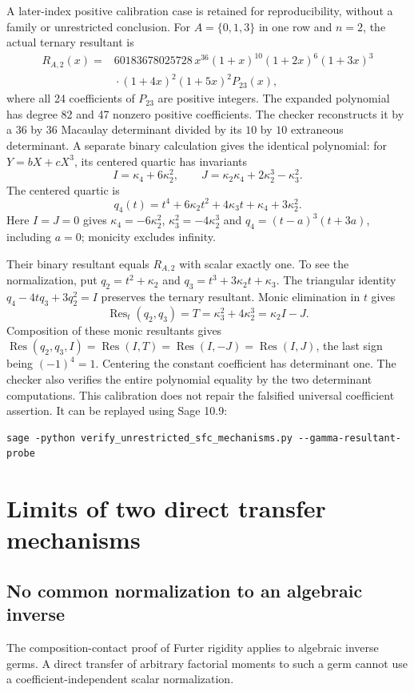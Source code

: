 \documentclass[11pt]{article}
\begin{document}
A later-index positive calibration case is retained for reproducibility,
without a family or unrestricted conclusion. For $A=\{0,1,3\}$ in one
row and $n=2$, the actual ternary resultant is
\[
 \begin{split}
 R_{A,2}(x)={}&60183678025728\,x^{36}
 (1+x)^{10}(1+2x)^6(1+3x)^3\\
 &{}\cdot(1+4x)^2(1+5x)^2 P_{23}(x),
 \end{split}
\]
where all 24 coefficients of $P_{23}$ are positive integers.
The expanded polynomial has degree 82 and 47 nonzero positive
coefficients. The checker reconstructs it by a $36$ by $36$ Macaulay
determinant divided by its $10$ by $10$ extraneous determinant.
A separate binary calculation gives the identical polynomial:
for $Y=bX+cX^3$, its centered quartic has invariants
\[
 I=\kappa_4+6\kappa_2^2,\qquad
 J=\kappa_2\kappa_4+2\kappa_2^3-\kappa_3^2.
\]
The centered quartic is
\[
 q_4(t)=t^4+6\kappa_2t^2+4\kappa_3t+\kappa_4+3\kappa_2^2.
\]
Here $I=J=0$ gives
$\kappa_4=-6\kappa_2^2$, $\kappa_3^2=-4\kappa_2^3$ and
$q_4=(t-a)^3(t+3a)$, including $a=0$; monicity excludes infinity.

Their binary resultant equals $R_{A,2}$ with scalar exactly one.
To see the normalization, put $q_2=t^2+\kappa_2$ and
$q_3=t^3+3\kappa_2t+\kappa_3$. The triangular identity
$q_4-4tq_3+3q_2^2=I$ preserves the ternary resultant.
Monic elimination in $t$ gives
\[
 \operatorname{Res}_t(q_2,q_3)
       =T=\kappa_3^2+4\kappa_2^3=\kappa_2 I-J.
\]
Composition of these monic resultants gives
$\operatorname{Res}(q_2,q_3,I)=\operatorname{Res}(I,T)
=\operatorname{Res}(I,-J)=\operatorname{Res}(I,J)$,
the last sign being $(-1)^4=1$. Centering the constant coefficient
has determinant one. The checker also verifies the entire polynomial
equality by the two determinant computations.
This calibration does not repair the falsified universal coefficient assertion.
It can be replayed using Sage 10.9:
\begin{verbatim}
sage -python verify_unrestricted_sfc_mechanisms.py --gamma-resultant-probe
\end{verbatim}


\section{Limits of two direct transfer mechanisms}

\subsection{No common normalization to an algebraic inverse}
The composition-contact proof of Furter rigidity applies to algebraic
inverse germs. A direct transfer of arbitrary factorial moments to such
a germ cannot use a coefficient-independent scalar normalization.
\end{document}
